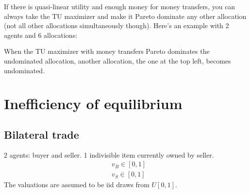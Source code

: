 \documentclass{article}
\begin{document}
\noindent
If there is quasi-linear utility and enough money for money transfers, you can always take the TU maximizer and make it Pareto dominate any other allocation (not all other allocations simultaneously though). Here's an example with 2 agents and 6 allocations:

\begin{center}
\end{center}

When the TU maximizer with money transfers Pareto dominates the undominated allocation, another allocation, the one at the top left, becomes undominated.

\section{Inefficiency of equilibrium}
\subsection*{Bilateral trade}
2 agents: buyer and seller. 1 indivisible item currently owned by seller.
\begin{equation*}
\begin{aligned}
    &v_B\in[0,1]\\
    &v_S\in[0,1]
\end{aligned}
\end{equation*}
The valuations are assumed to be iid draws from $U[0,1]$.\\
\end{document}
